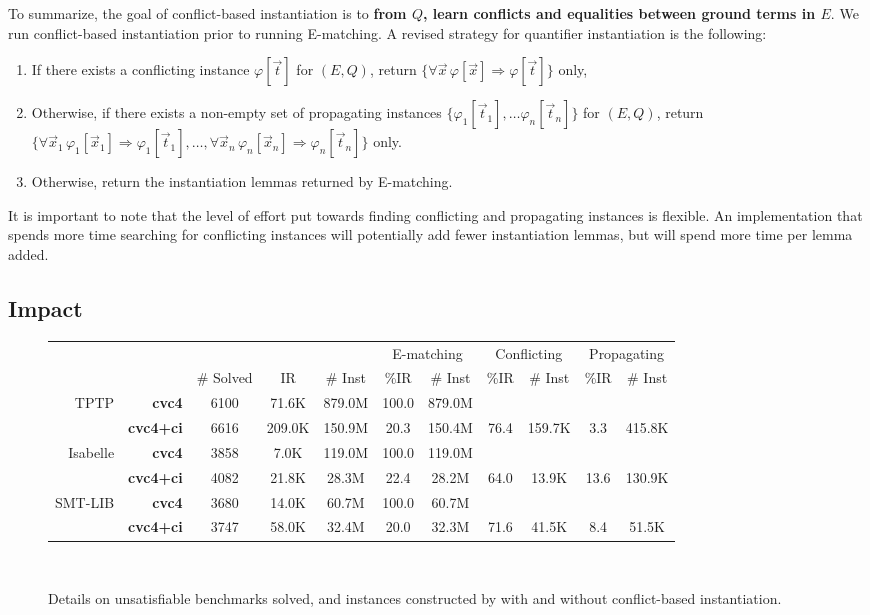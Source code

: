\documentclass[oribibl]{llncs}
\begin{document}
To summarize, the goal of conflict-based instantiation is to {\bf from $Q$, 
learn conflicts and equalities between ground terms in $E$}.
We run conflict-based instantiation prior to running E-matching.
A revised strategy for quantifier instantiation is the following:
\begin{enumerate}
\item If there exists a conflicting instance $\varphi[ \vec t ]$ for $( E, Q )$, 
return $\{ \forall \vec x\, \varphi[ \vec x ] \Rightarrow \varphi[ \vec t ] \}$ only,
\item Otherwise, if there exists a non-empty set of propagating instances $\{ \varphi_1[ \vec t_1 ], \ldots \varphi_n[ \vec t_n ] \}$ for $( E, Q )$,
return $\{ \forall \vec x_1\, \varphi_1[ \vec x_1 ] \Rightarrow \varphi_1[ \vec t_1 ], \ldots, \forall \vec x_n\, \varphi_n[ \vec x_n ] \Rightarrow \varphi_n[ \vec t_n ] \}$ only.
\item Otherwise, return the instantiation lemmas returned by E-matching.
\end{enumerate}
It is important to note that the level of effort put towards 
finding conflicting and propagating instances is flexible.
An implementation that spends more time searching for conflicting instances will potentially add fewer instantiation lemmas,
but will spend more time per lemma added.

\subsection{Impact}

\begin{figure}[t]
\centering
{%
\begin{tabular}{|r|r|c|cc|cc|cc|cc|}
\hline
  &  & & & & \multicolumn{2}{c|}{E-matching}  & \multicolumn{2}{c|}{Conflicting}  & \multicolumn{2}{c|}{Propagating}
\\
&   & \# Solved & IR & \# Inst & \%IR & \# Inst & \%IR & \# Inst & \%IR & \# Inst
\\
\hline 
 TPTP &  {\bf cvc4} & 6100 & 71.6K & 879.0M & 100.0 & 879.0M &  &  &  & 
\\
 & {\bf cvc4+ci} & 6616 & 209.0K & 150.9M & 20.3 & 150.4M & 76.4 & 159.7K & 3.3 & 415.8K
\\
\hline
 Isabelle & {\bf cvc4} & 3858 & 7.0K & 119.0M & 100.0 & 119.0M &  &  &  & 
\\
 & {\bf cvc4+ci} & 4082 & 21.8K & 28.3M & 22.4 & 28.2M & 64.0 & 13.9K & 13.6 & 130.9K
 \\
\hline
 SMT-LIB & {\bf cvc4} & 3680 & 14.0K & 60.7M & 100.0 & 60.7M &  &  &  & 
\\
 & {\bf cvc4+ci} & 3747 & 58.0K & 32.4M & 20.0 & 32.3M & 71.6 & 41.5K & 8.4 & 51.5K
\\
\hline
\end{tabular}
\\
}
\caption{
Details on unsatisfiable benchmarks solved, and instances constructed by \cvc with and without conflict-based instantiation.
}
\label{fig:results-inst-detail}
\end{figure}
\end{document}
